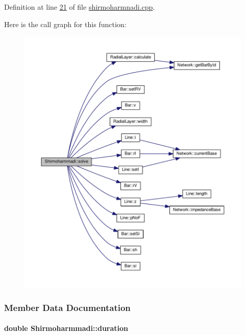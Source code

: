 Definition at line \hyperlink{shirmoharmnadi_8cpp_source_l00021}{21} of file \hyperlink{shirmoharmnadi_8cpp_source}{shirmoharmnadi.\+cpp}.



Here is the call graph for this function\+:\nopagebreak
\begin{figure}[H]
\begin{center}
\leavevmode
\includegraphics[width=350pt]{class_shirmoharmmadi_acb4a06c62b5d97c25bea70acd477e715_cgraph}
\end{center}
\end{figure}




\subsubsection{Member Data Documentation}
\hypertarget{class_shirmoharmmadi_a32ab19ff485833106bf68cd91dbc94e6}{}
\paragraph[{duration}]{\setlength{\rightskip}{0pt plus 5cm}double Shirmoharmmadi\+::duration}\label{class_shirmoharmmadi_a32ab19ff485833106bf68cd91dbc94e6}


